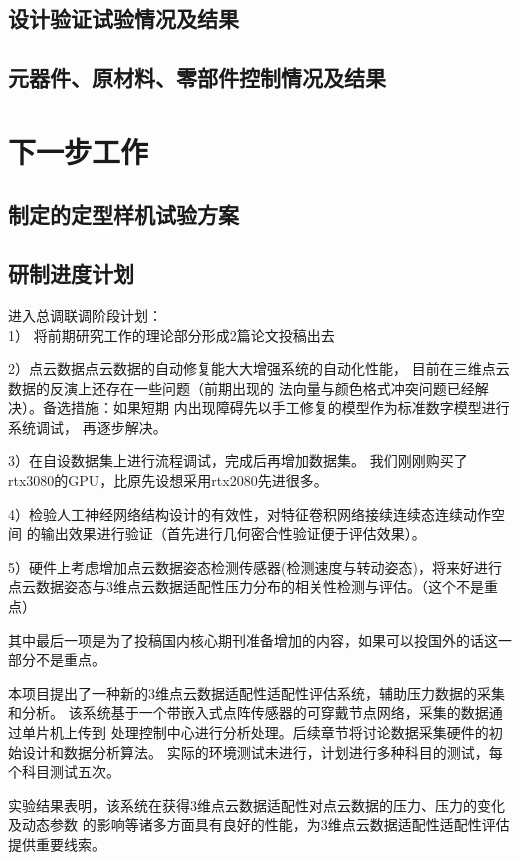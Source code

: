 \documentclass[a4paper,12pt]{ctexbook}	%
\begin{document}
\section{设计验证试验情况及结果}

\section{元器件、原材料、零部件控制情况及结果}

\chapter{下一步工作}

\section{制定的定型样机试验方案}

\section{研制进度计划}

进入总调联调阶段计划：\\
1） 将前期研究工作的理论部分形成2篇论文投稿出去

2）点云数据点云数据的自动修复能大大增强系统的自动化性能，
目前在三维点云数据的反演上还存在一些问题（前期出现的
法向量与颜色格式冲突问题已经解决）。备选措施：如果短期
内出现障碍先以手工修复的模型作为标准数字模型进行系统调试，
再逐步解决。

3）在自设数据集上进行流程调试，完成后再增加数据集。
我们刚刚购买了rtx3080的GPU，比原先设想采用rtx2080先进很多。

4）检验人工神经网络结构设计的有效性，对特征卷积网络接续连续态连续动作空间
的输出效果进行验证（首先进行几何密合性验证便于评估效果）。

5）硬件上考虑增加点云数据姿态检测传感器(检测速度与转动姿态)，将来好进行点云数据姿态与3维点云数据适配性压力分布的相关性检测与评估。（这个不是重点）

其中最后一项是为了投稿国内核心期刊准备增加的内容，如果可以投国外的话这一部分不是重点。


{\kaishu 本项目提出了一种新的3维点云数据适配性适配性评估系统，辅助压力数据的采集和分析。
该系统基于一个带嵌入式点阵传感器的可穿戴节点网络，采集的数据通过单片机上传到
处理控制中心进行分析处理。后续章节将讨论数据采集硬件的初始设计和数据分析算法。
实际的环境测试未进行，计划进行多种科目的测试，每个科目测试五次。}

{\songti 实验结果表明，该系统在获得3维点云数据适配性对点云数据的压力、压力的变化及动态参数
的影响等诸多方面具有良好的性能，为3维点云数据适配性适配性评估提供重要线索。}
\end{document}
